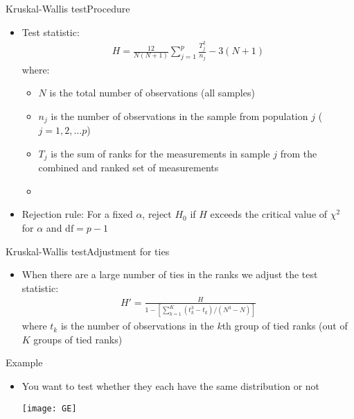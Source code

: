 \documentclass[xcolor=dvipsnames]{beamer}
\begin{document}
\begin{frame}{Kruskal-Wallis test}{Procedure}
	\begin{itemize}
		\item Test statistic:
		\begin{gather*}
		H = \frac{12}{N (N+1)} \sum_{j=1}^p \frac{T_j^2}{n_j} - 3(N + 1)
		\end{gather*}
		where: 
		\begin{itemize}
			\item $N$ is the total number of observations (all samples) 
			\item $n_j$ is the number of observations in the sample from population $j$ ($j = 1, 2, \hdots p$)
			\item $T_j$ is the sum of ranks for the measurements in sample $j$ from the combined and ranked set of measurements
			\item[]
		\end{itemize}\pause
		
		\item Rejection rule: For a fixed $\alpha$, reject $H_0$ if $H$ exceeds the critical value of $\chi^2$ for $\alpha$ and $\text{df} = p - 1$
	\end{itemize}
\end{frame}

\begin{frame}{Kruskal-Wallis test}{Adjustment for ties}
	\begin{itemize}
		\item When there are a large number of ties in the ranks we adjust the test statistic: \pause
		\begin{gather*}
			H' = \frac{H}{1 - \left[ \sum_{k=1}^K (t_k^3 - t_k)/(N^3 - N) \right]}
		\end{gather*}
		where $t_k$ is the number of observations in the $k$th group of tied ranks (out of $K$ groups of tied ranks)
	\end{itemize}
\end{frame}

\begin{frame}{Example}
	\begin{itemize}
		\item You want to test whether they each have the same distribution or not
		\begin{center}
			\texttt{[image: GE]}
		\end{center}
	\end{itemize}
\end{frame}
\end{document}
